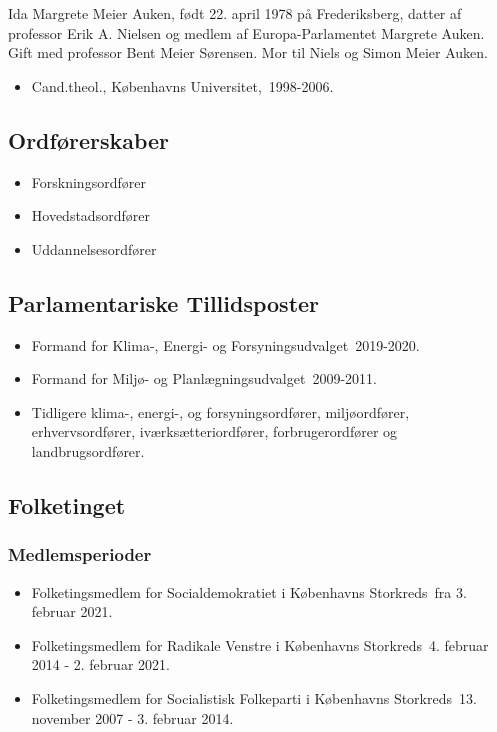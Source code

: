 \documentclass[11pt, a4paper]{awesome-cv}
\begin{document}
\makecvheader[R]
\makelettertitle
\begin{cvletter}
Ida Margrete Meier Auken, født 22. april 1978 på Frederiksberg, datter af professor Erik A. Nielsen og medlem af Europa-Parlamentet Margrete Auken. Gift med professor Bent Meier Sørensen. Mor til Niels og Simon Meier Auken.

\begin{itemize}
\item Cand.theol., Københavns Universitet, 1998-2006.
\end{itemize}
\subsection*{Ordførerskaber}
\begin{itemize}
\item Forskningsordfører
\item Hovedstadsordfører
\item Uddannelsesordfører
\end{itemize}
\subsection*{Parlamentariske Tillidsposter}
\begin{itemize}
\item Formand for Klima-, Energi- og Forsyningsudvalget 2019-2020.
\item Formand for Miljø- og Planlægningsudvalget 2009-2011.
\item Tidligere klima-, energi-, og forsyningsordfører, miljøordfører, erhvervsordfører, iværksætteriordfører, forbrugerordfører og landbrugsordfører.
\end{itemize}
\subsection*{Folketinget}
\subsubsection*{Medlemsperioder}
\begin{itemize}
\item Folketingsmedlem for Socialdemokratiet i Københavns Storkreds fra 3. februar 2021.
\item Folketingsmedlem for Radikale Venstre i Københavns Storkreds 4. februar 2014 - 2. februar 2021.
\item Folketingsmedlem for Socialistisk Folkeparti i Københavns Storkreds 13. november 2007 - 3. februar 2014.
\end{itemize}

\end{cvletter}
\end{document}
